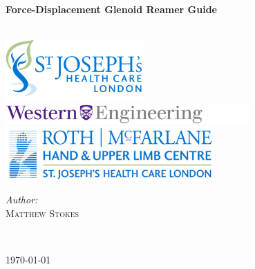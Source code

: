 \begin{titlepage}

\begin{center}

\HRule \\[0.4cm]
{ \huge \bfseries Force-Displacement Glenoid Reamer Guide}\\[0.4cm]

\HRule \\[1.5cm]

\begin{center}
\includegraphics[width=0.4\textwidth]{./images/jo.png}\\[1cm]  
\hspace{2cm}\includegraphics[width=0.7\textwidth]{./images/icon.png}\\[1cm]
\includegraphics[width=0.6\textwidth]{./images/hulc.jpg}\\[1cm] 
\end{center}



\vspace{4cm}
\begin{minipage}{0.4\textwidth}
\begin{flushleft} \large
\emph{Author:}\\
\textsc{Matthew Stokes}
\end{flushleft}
\end{minipage}
\begin{minipage}{0.4\textwidth}
\begin{flushright} \large
\emph{} \\
\textsc{}
\end{flushright}
\end{minipage}


\vfill
{\today}

\end{center}

\end{titlepage}